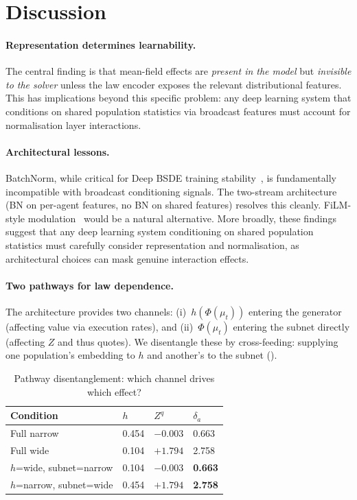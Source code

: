 \documentclass[11pt,a4paper]{article}
\newcommand{\mup}{\mu_t}
\begin{document}
\section{Discussion}
\label{sec:discussion}

\paragraph{Representation determines learnability.}
The central finding is that mean-field effects are \emph{present in the model} but \emph{invisible to the solver} unless the law encoder exposes the relevant distributional features. This has implications beyond this specific problem: any deep learning system that conditions on shared population statistics via broadcast features must account for normalisation layer interactions.

\paragraph{Architectural lessons.}
BatchNorm, while critical for Deep BSDE training stability~\cite{han2018solving}, is fundamentally incompatible with broadcast conditioning signals. The two-stream architecture (BN on per-agent features, no BN on shared features) resolves this cleanly. FiLM-style modulation~\cite{perez2018film} would be a natural alternative. More broadly, these findings suggest that any deep learning system conditioning on shared population statistics must carefully consider representation and normalisation, as architectural choices can mask genuine interaction effects.

\paragraph{Two pathways for law dependence.}
The architecture provides two channels: (i)~$h(\Phi(\mup))$ entering the generator (affecting value via execution rates), and (ii)~$\Phi(\mup)$ entering the subnet directly (affecting $Z$ and thus quotes). We disentangle these by cross-feeding: supplying one population's embedding to $h$ and another's to the subnet ().

\begin{table}[!htb]
\centering
\caption{Pathway disentanglement: which channel drives which effect?}
\label{tab:disentangle}
\begin{tabular}{@{}llll@{}}
\toprule
Condition & $h$ & $Z^q$ & $\delta_a$ \\
\midrule
Full narrow & 0.454 & $-0.003$ & 0.663 \\
Full wide & 0.104 & $+1.794$ & 2.758 \\
$h$=wide, subnet=narrow & 0.104 & $-0.003$ & \textbf{0.663} \\
$h$=narrow, subnet=wide & 0.454 & $+1.794$ & \textbf{2.758} \\
\bottomrule
\end{tabular}
\end{table}
\end{document}
